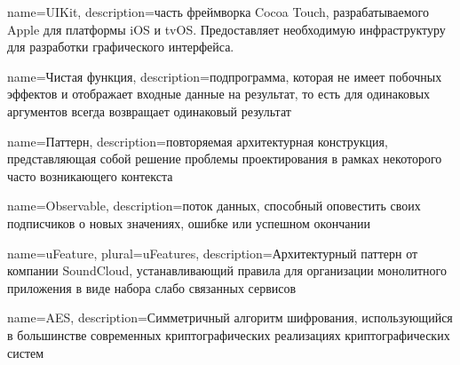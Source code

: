 

{
  name={UIKit},
  description={часть фреймворка Cocoa Touch, разрабатываемого Apple для платформы iOS и tvOS. Предоставляет необходимую инфраструктуру для разработки графического интерфейса.}
}

{
  name={Чистая функция},
  description={подпрограмма, которая не имеет побочных эффектов и отображает входные данные на результат, то есть для одинаковых аргументов всегда возвращает одинаковый результат}
}

{
  name={Паттерн},
  description={повторяемая архитектурная конструкция, представляющая собой решение проблемы проектирования в рамках некоторого часто возникающего контекста}
}

{
  name=Observable,
  description={поток данных, способный оповестить своих подписчиков о новых значениях, ошибке или успешном окончании}
}

{
  name=uFeature,
  plural={uFeatures},
  description={Архитектурный паттерн от компании SoundCloud, устанавливающий правила для организации монолитного приложения в виде набора слабо связанных сервисов}
}

{
  name=AES,
  description={Симметричный алгоритм шифрования, использующийся в большинстве современных криптографических реализациях криптографических систем}
}


\glsaddall


\printglossaries